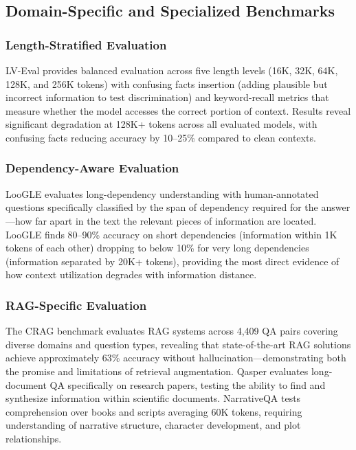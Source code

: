 \documentclass[11pt,letterpaper]{article}
\begin{document}
\subsection{Domain-Specific and Specialized Benchmarks}

\subsubsection{Length-Stratified Evaluation}

LV-Eval provides balanced evaluation across five length levels (16K, 32K, 64K, 128K, and 256K tokens) with confusing facts insertion (adding plausible but incorrect information to test discrimination) and keyword-recall metrics that measure whether the model accesses the correct portion of context. Results reveal significant degradation at 128K+ tokens across all evaluated models, with confusing facts reducing accuracy by 10--25\% compared to clean contexts.

\subsubsection{Dependency-Aware Evaluation}

LooGLE evaluates long-dependency understanding with human-annotated questions specifically classified by the span of dependency required for the answer---how far apart in the text the relevant pieces of information are located. LooGLE finds 80--90\% accuracy on short dependencies (information within 1K tokens of each other) dropping to below 10\% for very long dependencies (information separated by 20K+ tokens), providing the most direct evidence of how context utilization degrades with information distance.

\subsubsection{RAG-Specific Evaluation}

The CRAG benchmark evaluates RAG systems across 4,409 QA pairs covering diverse domains and question types, revealing that state-of-the-art RAG solutions achieve approximately 63\% accuracy without hallucination---demonstrating both the promise and limitations of retrieval augmentation. Qasper evaluates long-document QA specifically on research papers, testing the ability to find and synthesize information within scientific documents. NarrativeQA tests comprehension over books and scripts averaging 60K tokens, requiring understanding of narrative structure, character development, and plot relationships.
\end{document}
